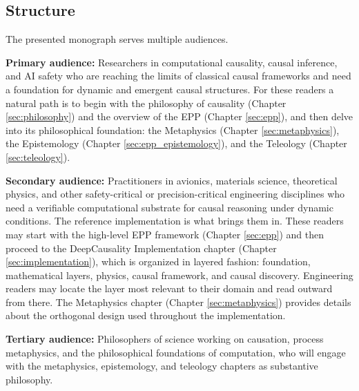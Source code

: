 \subsection{Structure}

The presented monograph serves multiple audiences.

\textbf{Primary audience:} Researchers in computational causality, causal inference, and AI safety who are reaching the limits of classical causal frameworks and need a foundation for dynamic and emergent causal structures. For these readers a natural path is to begin with the philosophy of causality (Chapter \ref{sec:philosophy}) and the overview of the EPP (Chapter \ref{sec:epp}), and then delve into its philosophical foundation: the Metaphysics (Chapter \ref{sec:metaphysics}), the Epistemology (Chapter \ref{sec:epp_epistemology}), and the Teleology (Chapter \ref{sec:teleology}).

\textbf{Secondary audience:} Practitioners in avionics, materials science, theoretical physics, and other safety-critical or precision-critical engineering disciplines who need a verifiable computational substrate for causal reasoning under dynamic conditions. The reference implementation is what brings them in. These readers may start with the high-level EPP framework (Chapter \ref{sec:epp}) and then proceed to the DeepCausality Implementation chapter (Chapter \ref{sec:implementation}), which is organized in layered fashion: foundation, mathematical layers, physics, causal framework, and causal discovery. Engineering readers may locate the layer most relevant to their domain and read outward from there. The Metaphysics chapter (Chapter \ref{sec:metaphysics}) provides details about the orthogonal design used throughout the implementation.


\textbf{Tertiary audience:} Philosophers of science working on causation, process metaphysics, and the philosophical foundations of computation, who will engage with the metaphysics, epistemology, and teleology chapters as substantive philosophy.


\newpage
